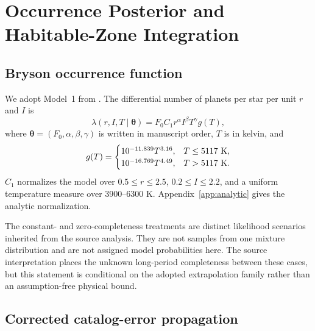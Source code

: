 \section{Occurrence Posterior and Habitable-Zone Integration}\label{sec:occurrence}

\subsection{Bryson occurrence function}

We adopt Model~1 from \citet{Bryson2021}. The differential number of planets
per star per unit $r$ and $I$ is
\begin{equation}
 \lambda(r,I,T\mid\bm\theta)
 =F_0C_1r^\alpha I^\beta T^\gamma g(T),
 \label{eq:lambda}
\end{equation}
where $\bm\theta=(F_0,\alpha,\beta,\gamma)$ is written in manuscript order,
$T$ is in kelvin, and
\begin{equation}
 g(T)=
 \begin{cases}
 10^{-11.839}T^{3.16}, & T\leq5117\ {\rm K},\\
 10^{-16.769}T^{4.49}, & T>5117\ {\rm K}.
 \end{cases}
 \label{eq:gT}
\end{equation}
$C_1$ normalizes the model over $0.5\leq r\leq2.5$,
$0.2\leq I\leq2.2$, and a uniform temperature measure over 3900--6300 K.
Appendix~\ref{app:analytic} gives the analytic normalization.

The constant- and zero-completeness treatments are distinct likelihood
scenarios inherited from the source analysis. They are not samples from one
mixture distribution and are not assigned model probabilities here. The
source interpretation places the unknown long-period completeness between
these cases, but this statement is conditional on the adopted extrapolation
family rather than an assumption-free physical bound.

\subsection{Corrected catalog-error propagation}\label{subsec:measurement}

